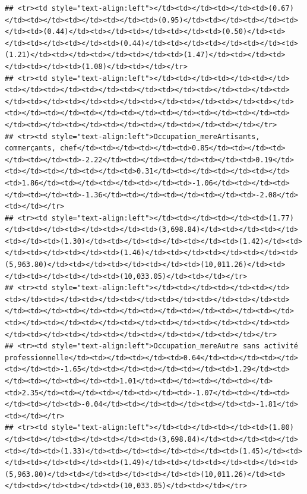 \documentclass[
]{article}
\begin{document}
\begin{verbatim}
## <tr><td style="text-align:left"></td><td></td><td></td><td>(0.67)</td><td></td><td></td><td></td><td>(0.95)</td><td></td><td></td><td></td><td>(0.44)</td><td></td><td></td><td></td><td>(0.50)</td><td></td><td></td><td></td><td>(0.44)</td><td></td><td></td><td></td><td>(1.21)</td><td></td><td></td><td></td><td>(1.47)</td><td></td><td></td><td></td><td>(1.08)</td><td></td></tr>
## <tr><td style="text-align:left"></td><td></td><td></td><td></td><td></td><td></td><td></td><td></td><td></td><td></td><td></td><td></td><td></td><td></td><td></td><td></td><td></td><td></td><td></td><td></td><td></td><td></td><td></td><td></td><td></td><td></td><td></td><td></td><td></td><td></td><td></td><td></td><td></td></tr>
## <tr><td style="text-align:left">Occupation_mereArtisants, commerçants, chef</td><td></td><td></td><td>0.85</td><td></td><td></td><td></td><td>-2.22</td><td></td><td></td><td></td><td>0.19</td><td></td><td></td><td></td><td>0.31</td><td></td><td></td><td></td><td>1.86</td><td></td><td></td><td></td><td>-1.06</td><td></td><td></td><td></td><td>-1.36</td><td></td><td></td><td></td><td>-2.08</td><td></td></tr>
## <tr><td style="text-align:left"></td><td></td><td></td><td>(1.77)</td><td></td><td></td><td></td><td>(3,698.84)</td><td></td><td></td><td></td><td>(1.30)</td><td></td><td></td><td></td><td>(1.42)</td><td></td><td></td><td></td><td>(1.46)</td><td></td><td></td><td></td><td>(5,963.80)</td><td></td><td></td><td></td><td>(10,011.26)</td><td></td><td></td><td></td><td>(10,033.05)</td><td></td></tr>
## <tr><td style="text-align:left"></td><td></td><td></td><td></td><td></td><td></td><td></td><td></td><td></td><td></td><td></td><td></td><td></td><td></td><td></td><td></td><td></td><td></td><td></td><td></td><td></td><td></td><td></td><td></td><td></td><td></td><td></td><td></td><td></td><td></td><td></td><td></td><td></td></tr>
## <tr><td style="text-align:left">Occupation_mereAutre sans activité professionnelle</td><td></td><td></td><td>0.64</td><td></td><td></td><td></td><td>-1.65</td><td></td><td></td><td></td><td>1.29</td><td></td><td></td><td></td><td>1.01</td><td></td><td></td><td></td><td>2.35</td><td></td><td></td><td></td><td>-1.07</td><td></td><td></td><td></td><td>-0.04</td><td></td><td></td><td></td><td>-1.81</td><td></td></tr>
## <tr><td style="text-align:left"></td><td></td><td></td><td>(1.80)</td><td></td><td></td><td></td><td>(3,698.84)</td><td></td><td></td><td></td><td>(1.33)</td><td></td><td></td><td></td><td>(1.45)</td><td></td><td></td><td></td><td>(1.49)</td><td></td><td></td><td></td><td>(5,963.80)</td><td></td><td></td><td></td><td>(10,011.26)</td><td></td><td></td><td></td><td>(10,033.05)</td><td></td></tr>

\end{verbatim}
\end{document}
